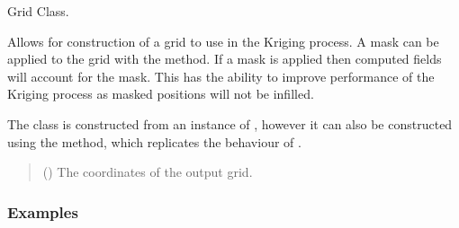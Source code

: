 \documentclass[letterpaper,10pt,english]{sphinxmanual}
\begin{document}
\begin{fulllineitems}
\label{\detokenize{grid:glomar_gridding.grid.Grid}}
\pysigstartsignatures
\pysiglinewithargsret
{}
{}
{}
\pysigstopsignatures
\sphinxAtStartPar
Grid Class.

\sphinxAtStartPar
Allows for construction of a grid to use in the Kriging process. A mask
can be applied to the grid with the  method. If a mask is applied
then computed fields will account for the mask. This has the ability to
improve performance of the Kriging process as masked positions will not be
infilled.

\sphinxAtStartPar
The class is constructed from an instance of , however
it can also be constructed using the  method, which
replicates the behaviour of
{\hyperref[\detokenize{covariance:glomar_gridding.grid.grid_from_resolution}]{}}.
\begin{quote}\begin{description}
\sphinxAtStartPar
{} () \textendash{} The coordinates of the output grid.

\end{description}\end{quote}
\subsubsection*{Examples}


\end{fulllineitems}
\end{document}
